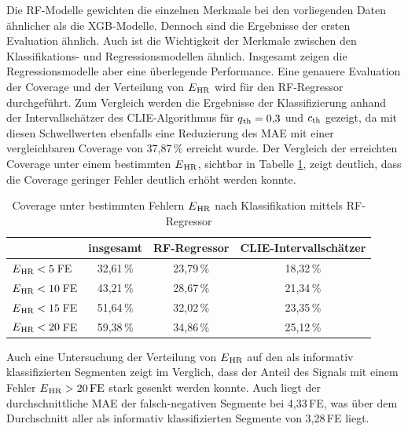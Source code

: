  Die \ac{RF}-Modelle gewichten die einzelnen Merkmale bei den vorliegenden Daten ähnlicher als die \ac{XGB}-Modelle. Dennoch sind die Ergebnisse der ersten Evaluation ähnlich. Auch ist die Wichtigkeit der Merkmale zwischen den Klassifikations- und Regressionsmodellen ähnlich. Insgesamt zeigen die Regressionsmodelle aber eine überlegende Performance. Eine genauere Evaluation der Coverage und der Verteilung von $E\textsubscript{HR}$ wird für den \ac{RF}-Regressor durchgeführt. Zum Vergleich werden die Ergebnisse der Klassifizierung anhand der Intervallschätzer des \ac{CLIE}-Algorithmus für $q\textsubscript{th}=0{,}3$ und $c\textsubscript{th}$ gezeigt, da mit diesen Schwellwerten ebenfalls eine Reduzierung des \ac{MAE} mit einer vergleichbaren Coverage von 37,87\,\% erreicht wurde. Der Vergleich der erreichten Coverage unter einem bestimmten $E\textsubscript{HR}$, sichtbar in Tabelle \ref{fig:own-coverage-default}, zeigt deutlich, dass die Coverage geringer Fehler deutlich erhöht werden konnte. 
 
  \begin{table}[h]
 	\centering
  	\begin{tabular}{l || c | c | c}
 											& insgesamt 		& \ac{RF}-Regressor & \ac{CLIE}-Intervallschätzer\\\hline
 		$E\textsubscript{HR} < 5$\,\si{FE} 	&  32{,}61\,\% 	& 23,79\,\% 			& 18,32\,\%\\
 		$E\textsubscript{HR} < 10$\,\si{FE} 	&  43{,}21\,\% 	& 28,67\,\% 			& 21,34\,\%\\
 		$E\textsubscript{HR} < 15$\,\si{FE} 	&  51{,}64\,\% 	& 32,02\,\% 			& 23,35\,\%\\
 		$E\textsubscript{HR} < 20$\,\si{FE} 	&  59{,}38\,\% 	& 34,86\,\% 			& 25,12\,\%\\
 	\end{tabular}
 	\caption[Coverage unter bestimmten Fehlern $E\textsubscript{HR}$ nach Klassifikation mittels \ac{RF}-Regressor]{Coverage unter bestimmten Fehlern $E\textsubscript{HR}$ nach Klassifikation mittels \ac{RF}-Regressor}
 	\label{fig:own-coverage-default}
 \end{table}
 
 Auch eine Untersuchung der Verteilung von $E\textsubscript{HR}$ auf den als informativ klassifizierten Segmenten zeigt im Verglich, dass der Anteil des Signals mit einem Fehler $E\textsubscript{HR} > 20\,\si{FE}$ stark gesenkt werden konnte. Auch liegt der durchschnittliche \ac{MAE} der falsch-negativen Segmente bei 4,33\,\si{FE}, was über dem Durchschnitt aller als informativ klassifizierten Segmente von 3,28\,\si{FE} liegt.
 

